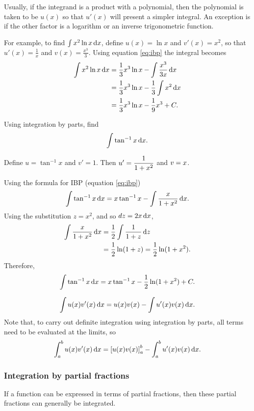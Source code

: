 Usually, if the integrand is a product with a polynomial, then the polynomial is taken to be $u(x)$ so that $u'(x)$ will present a simpler integral. An exception is if the other factor is a logarithm or an inverse trigonometric function.

For example, to find $\int x^2\ln x\,{\rm d}x$, define $u(x)=\ln x$ and $v'(x)=x^2$, so that $u'(x)=\frac{1}{x}$ and $v(x)=\frac{x^3}{3}$. Using equation \eqref{eq:ibp} the integral becomes
\begin{align*}
    \int x^2\ln x\,{\rm d}x &= \frac{1}{3}x^3\ln x-\int\frac{x^3}{3x}\,{\rm d}x\\
    &=\frac{1}{3}x^3\ln x-\frac{1}{3}\int x^2\,{\rm d}x\\
    &= \frac{1}{3}x^3\ln x-\frac{1}{9}x^3+C.
\end{align*}

\begin{example}[Lecture]
Using integration by parts, find
\[
\int\tan^{-1}x\,{\rm d}x.
\]
\end{example}

\begin{solution}
Define $u=\tan^{-1}x$ and $v'=1$. Then $u'=\dfrac{1}{1+x^2}$ and $v=x$.

Using the formula for IBP (equation \eqref{eq:ibp})
\[
\int\tan^{-1}x\,{\rm d}x=x\tan^{-1}x-\int\frac{x}{1+x^2}\,{\rm d}x.
\]
Using the substitution $z=x^2$, and so $dz=2x\,{\rm d}x$,
\begin{align*}
    \int\frac{x}{1+x^2}\,{\rm d}x&=\frac{1}{2}\int\frac{1}{1+z}\,{\rm d}z\\
    &=\frac{1}{2}\ln(1+z) = \frac{1}{2}\ln(1+x^2).
\end{align*}
Therefore,
\[
\int\tan^{-1}x\,{\rm d}x=x\tan^{-1}x-\frac{1}{2}\ln(1+x^2)+C.
\]
\end{solution}

\[
\int u(x)v'(x)\,{\rm d}x=u(x)v(x)-\int u'(x)v(x)\,{\rm d}x.
\]
Note that, to carry out definite integration using integration by parts, all terms need to be evaluated at the limits, so
\[
\int_a^b u(x)v'(x)\,{\rm d}x=\left[u(x)v(x)\right]_a^b-\int_a^b u'(x)v(x)\,{\rm d}x.
\]

\subsubsection{Integration by partial fractions} 
\label{sec:IBpartfrac}

If a function can be expressed in terms of partial fractions, then these partial fractions can generally be integrated.

